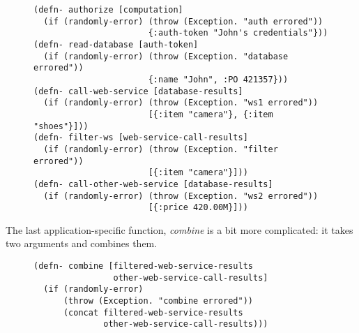 \documentclass[11pt]{article}
\begin{document}
\begin{figure}[H]
\label{functional-helpers-4}
\begin{verbatim}
(defn- authorize [computation]
  (if (randomly-error) (throw (Exception. "auth errored"))
                       {:auth-token "John's credentials"}))
(defn- read-database [auth-token]
  (if (randomly-error) (throw (Exception. "database errored"))
                       {:name "John", :PO 421357}))
(defn- call-web-service [database-results]
  (if (randomly-error) (throw (Exception. "ws1 errored"))
                       [{:item "camera"}, {:item "shoes"}]))
(defn- filter-ws [web-service-call-results]
  (if (randomly-error) (throw (Exception. "filter errored"))
                       [{:item "camera"}]))
(defn- call-other-web-service [database-results]
  (if (randomly-error) (throw (Exception. "ws2 errored"))
                       [{:price 420.00M}]))
\end{verbatim}
\end{figure}

The last application-specific function, \emph{combine} is a bit more
complicated: it takes two arguments and combines them.

\begin{figure}[H]
\label{functional-helpers-5}
\begin{verbatim}
(defn- combine [filtered-web-service-results
                other-web-service-call-results]
  (if (randomly-error)
      (throw (Exception. "combine errored"))
      (concat filtered-web-service-results
              other-web-service-call-results)))
\end{verbatim}
\end{figure}
\end{document}
